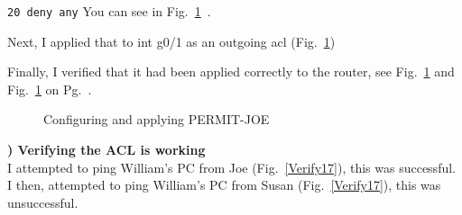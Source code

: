 \documentclass{report}
\newcommand{\mysubsection}[2]{\textbf{\romannumeral #1) #2}}
\begin{document}
{\scriptsize{\verb$20 deny any$}\normalsize} 
You can see in Fig.~\ref{acl17}~.


Next, I applied that to int g0/1 as an outgoing
acl (Fig.~\ref{acl17})

Finally, I verified that it had been applied correctly to the router, see
Fig.~\ref{acl17} and Fig.~\ref{acl17} on
Pg.~\pageref{acl17}.

\begin{figure}[!hbt]\centering
{}\hfill
{}\par
{}\hfill
{}\par
\caption{Configuring and applying PERMIT-JOE}\label{acl17}
\end{figure}



\noindent\mysubsection{4}{Verifying the ACL is working}\\
I attempted to ping William's PC from
Joe (Fig.~\ref{Verify17}), this was successful.
I then, attempted to ping William's PC from
Susan (Fig.~\ref{Verify17}), this was unsuccessful.
\end{document}
